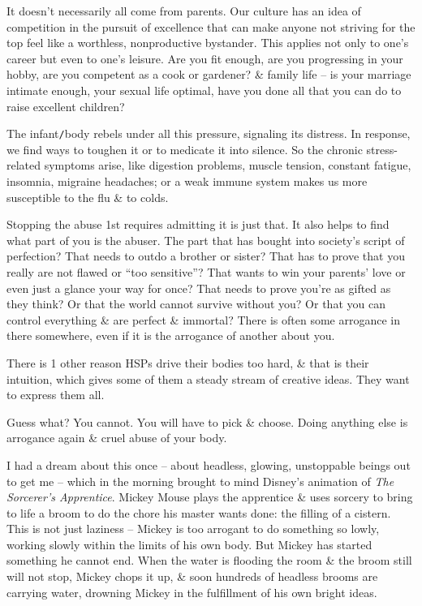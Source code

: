 \documentclass{article}
\numberwithin{equation}{section}
\begin{document}
It doesn't necessarily all come from parents. Our culture has an idea of competition in the pursuit of excellence that can make anyone not striving for the top feel like a worthless, nonproductive bystander. This applies not only to one's career but even to one's leisure. Are you fit enough, are you progressing in your hobby, are you competent as a cook or gardener? \& family life -- is your marriage intimate enough, your sexual life optimal, have you done all that you can do to raise excellent children?

The infant{\tt/}body rebels under all this pressure, signaling its distress. In response, we find ways to toughen it or to medicate it into silence. So the chronic stress-related symptoms arise, like digestion problems, muscle tension, constant fatigue, insomnia, migraine headaches; or a weak immune system makes us more susceptible to the flu \& to colds.

Stopping the abuse 1st requires admitting it is just that. It also helps to find what part of you is the abuser. The part that has bought into society's script of perfection? That needs to outdo a brother or sister? That has to prove that you really are not flawed or ``too sensitive''? That wants to win your parents' love or even just a glance your way for once? That needs to prove you're as gifted as they think? Or that the world cannot survive without you? Or that you can control everything \& are perfect \& immortal? There is often some arrogance in there somewhere, even if it is the arrogance of another about you.

There is 1 other reason HSPs drive their bodies too hard, \& that is their intuition, which gives some of them a steady stream of creative ideas. They want to express them all.

Guess what? You cannot. You will have to pick \& choose. Doing anything else is arrogance again \& cruel abuse of your body.

I had a dream about this once -- about headless, glowing, unstoppable beings out to get me -- which in the morning brought to mind Disney's animation of \textit{The Sorcerer's Apprentice}. Mickey Mouse plays the apprentice \& uses sorcery to bring to life a broom to do the chore his master wants done: the filling of a cistern. This is not just laziness -- Mickey is too arrogant to do something so lowly, working slowly within the limits of his own body. But Mickey has started something he cannot end. When the water is flooding the room \& the broom still will not stop, Mickey chops it up, \& soon hundreds of headless brooms are carrying water, drowning Mickey in the fulfillment of his own bright ideas.
\end{document}
